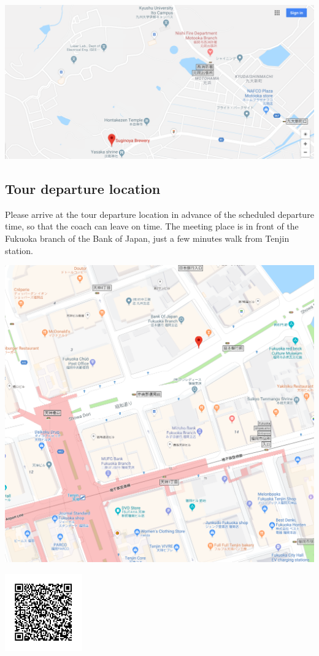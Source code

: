 \noindent\includegraphics[width=\textwidth]{suginoya.png}

\newpage
\subsection*{Tour departure location}

Please arrive at the tour departure location in advance of the scheduled departure time, so that the
coach can leave on time.   
The meeting place is in front of the Fukuoka branch of the Bank of Japan, just a few minutes walk from Tenjin station.

\noindent\includegraphics[width=\textwidth]{tour_meeting_place.png}

\includegraphics[width=0.25\textwidth]{tour_meeting_place_qrcode.png}


